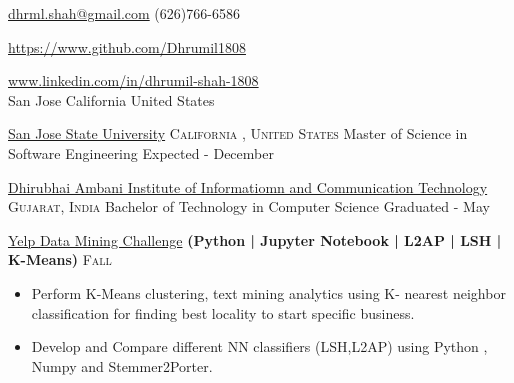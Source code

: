 \documentclass[10pt,a4paper]{article}
\begin{document}
\sloppy  %



\nobreakvspace{0.4em}

\noindent\href{mailto:dhrml.shah.at.gmail.dot.com}{dhrml.shah\mbox{}@\mbox{}gmail.com}\sbull
\textsmaller (626)766-6586\sbull
{\newnums \href{https://github.com/Dhrumil1808}{https://www.github.com/Dhrumil1808}\sbull
{\mewmums \href{https://www.linkedin.com/in/dhrumil-shah-1808/}{www.linkedin.com/in/dhrumil-shah-1808}
\\
{San Jose\sbull
California\sbull
United States
}


\headedsection
  {\href{http://www.sjsu.edu/}{San Jose State University} }
  {\textsc {California , United States}} {%
  \headedsubsection
    {Master of Science in Software Engineering}
    {Expected - December }
    {}
}


\headedsection
  {\href{http://daiict.ac.in}{Dhirubhai Ambani Institute of Informatiomn and Communication Technology} }
  {\textsc{Gujarat, India}} {%
  \headedsubsection
    {Bachelor of Technology in Computer Science }
    {Graduated - May }
    {}
}

\spacedhrule{0.0em}{-0.4em}




\headedsection  %
  {\href{https://github.com/Dhrumil1808/Yelp-datamining}{Yelp Data Mining Challenge}
  \textbf{
  \small{(Python | Jupyter Notebook | L2AP | LSH | K-Means)}}}
  {\textsc{Fall }} {%
  
    {\bodytext
    {
    \begin{itemize}
        \item Perform K-Means clustering, text mining analytics using K- nearest neighbor classification for finding best locality to start specific business.
        \item Develop and Compare different NN classifiers (LSH,L2AP) using Python , Numpy and Stemmer2Porter.
    \end{itemize}}}
}

}}
\end{document}
